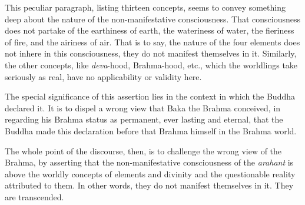 This peculiar paragraph, listing thirteen concepts, seems to convey something deep about the nature of the non-manifestative consciousness. That consciousness does not partake of the earthiness of earth, the wateriness of water, the fieriness of fire, and the airiness of air. That is to say, the nature of the four elements does not inhere in this consciousness, they do not manifest themselves in it. Similarly, the other concepts, like \emph{deva}-hood, Brahma-hood, etc., which the worldlings take seriously as real, have no applicability or validity here.

The special significance of this assertion lies in the context in which the Buddha declared it. It is to dispel a wrong view that Baka the Brahma conceived, in regarding his Brahma status as permanent, ever lasting and eternal, that the Buddha made this declaration before that Brahma himself in the Brahma world.

The whole point of the discourse, then, is to challenge the wrong view of the Brahma, by asserting that the non-manifestative consciousness of the \emph{arahant} is above the worldly concepts of elements and divinity and the questionable reality attributed to them. In other words, they do not manifest themselves in it. They are transcended.
